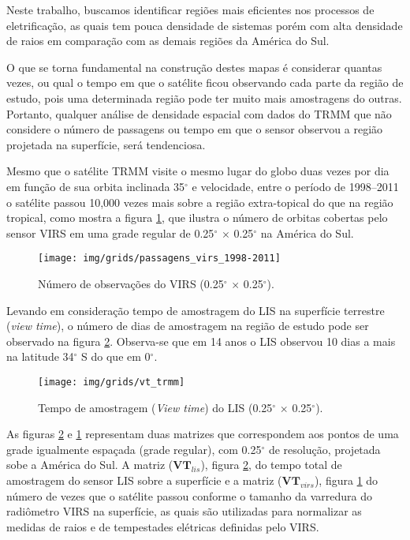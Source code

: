 Neste trabalho, buscamos identificar regiões mais eficientes nos processos de eletrificação, as quais tem pouca densidade de sistemas porém com alta densidade de raios em comparação com as demais regiões da América do Sul.

O que se torna fundamental na construção destes mapas é considerar quantas vezes, ou qual o tempo em que o satélite ficou observando cada parte da região de estudo, pois uma determinada região pode ter muito mais amostragens do outras. Portanto, qualquer análise de densidade espacial com dados do TRMM que não considere o número de passagens ou tempo em que o sensor observou a região projetada na superfície, será tendenciosa.

Mesmo que o satélite TRMM visite o mesmo lugar do globo duas vezes por dia em função de sua orbita inclinada 35$^{\circ}$ e velocidade, entre o período de 1998--2011 o satélite passou 10,000 vezes mais sobre a região extra-topical do que na região tropical, como mostra a figura \ref{VirsVT}, que ilustra o número de orbitas cobertas pelo sensor VIRS em uma grade regular de 0.25$^{\circ}$  $\times$ 0.25$^{\circ}$ na América do Sul.


\begin{figure}[!hb]
  \centering
  {{\texttt{[image: img/grids/passagens\_virs\_1998-2011]}}}
\caption{Número de observações do VIRS (0.25$^{\circ}$  $\times$ 0.25$^{\circ}$).}
\label{VirsVT}
\end{figure} 



Levando em consideração tempo de amostragem do LIS na superfície terrestre (\textit{view time}), o número de dias de amostragem na região de estudo pode ser observado na figura \ref{lisVT}. Observa-se que em 14 anos o LIS observou 10 dias a mais na latitude 34$^{\circ}$ S do que em 0$^{\circ}$.


\begin{figure}[!ht]
  \centering
  {{\texttt{[image: img/grids/vt\_trmm]}} }
  \caption{Tempo de amostragem (\textit{View time}) do LIS (0.25$^{\circ}$  $\times$ 0.25$^{\circ}$).}
\label{lisVT}
\end{figure} 

As figuras  \ref{lisVT} e \ref{VirsVT} representam duas matrizes que correspondem aos pontos de uma grade igualmente espaçada (grade regular), com 0.25$^{\circ}$ de resolução, projetada sobe a América do Sul. A matriz ($\mathbf{VT}_{lis}$), figura \ref{lisVT}, do tempo total de amostragem do sensor LIS sobre a superfície e a matriz ($\mathbf{VT}_{virs}$), figura \ref{VirsVT} do número de vezes que o satélite passou conforme o tamanho da varredura do radiômetro VIRS na superfície, as quais são utilizadas para normalizar as medidas de raios e de tempestades elétricas definidas pelo VIRS.  

